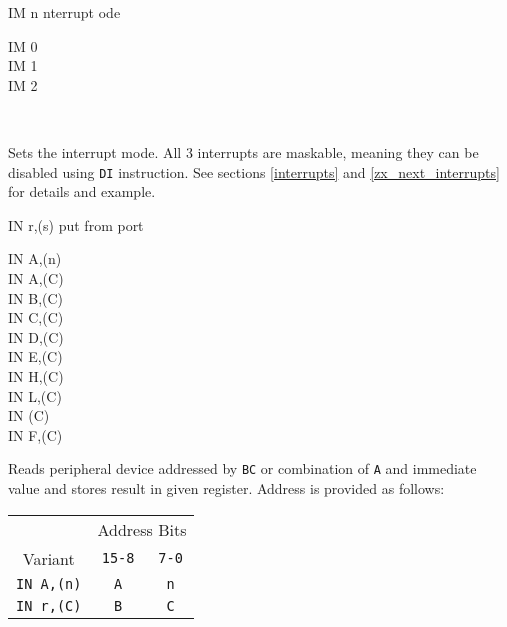 \documentclass[12pt,twoside,openright,a4paper]{book}
\begin{document}
\begin{basedescript}{
	\desclabelstyle{\multilinelabel}
	\desclabelwidth{3cm}}
	\begin{DetailItem}{IM n}
		{nterrupt ode}
		{}

		\begin{DetailVariants}[1]
			IM 0\\
			IM 1\\
			IM 2
			
			\columnbreak
			~
		\end{DetailVariants}

		Sets the interrupt mode. All 3 interrupts are maskable, meaning they can be disabled using {\tt DI} instruction. See sections \ref{interrupts} and \ref{zx_next_interrupts} for details and example.

		\begin{DetailEffects}
			\FlagsIM		
		\end{DetailEffects}

		\begin{DetailTiming}
		\end{DetailTiming}

	\end{DetailItem}

	\pagebreak
	\begin{DetailItem}{IN r,(s)}
		{put from port}
		{}

		\begin{DetailVariants}
			IN A,(n)\\
			IN A,(C)\\
			IN B,(C)\\
			IN C,(C)\\
			IN D,(C)\\
			IN E,(C)\\
			IN H,(C)\\
			IN L,(C)\\
			IN (C)\UNDOC\\
			IN F,(C)\UNDOC
		\end{DetailVariants}

		Reads peripheral device addressed by {\tt BC} or combination of {\tt A} and immediate value and stores result in given register. Address is provided as follows:

		\begin{tabular}{ccc}
			& \multicolumn{2}{c}{Address Bits} \\
			Variant & {\tt 15-8} & {\tt 7-0} \\
			\hline
			{\tt IN A,(n)} & {\tt A} & {\tt n} \\
			{\tt IN r,(C)} & {\tt B} & {\tt C} \\
		\end{tabular}
		\vspace{1ex} %


\end{DetailItem}
\end{basedescript}
\end{document}
